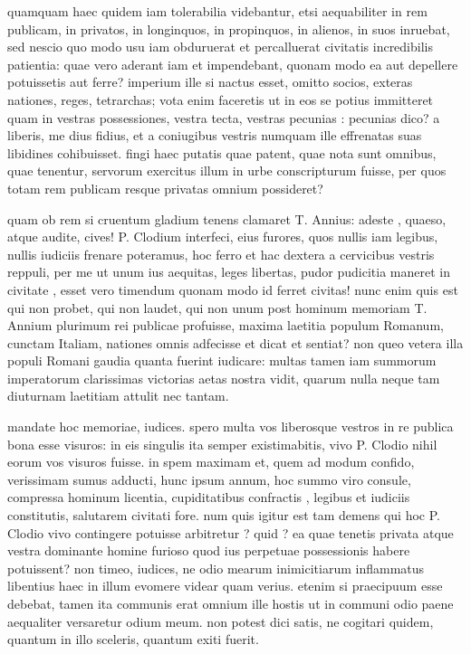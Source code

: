  quamquam haec quidem iam tolerabilia videbantur, etsi aequabiliter in rem publicam, in privatos, in longinquos, in propinquos, in alienos, in suos inruebat, sed nescio quo modo usu iam obduruerat et percalluerat civitatis incredibilis patientia: quae vero aderant iam et impendebant, quonam modo ea aut depellere potuissetis aut ferre? imperium ille si nactus esset, omitto socios, exteras nationes, reges, tetrarchas; vota enim faceretis ut in eos se potius immitteret quam in vestras possessiones, vestra tecta, vestras pecunias : pecunias dico? a liberis, me dius fidius, et a coniugibus vestris numquam ille effrenatas suas libidines cohibuisset. fingi haec putatis quae patent, quae nota sunt omnibus, quae tenentur, servorum exercitus illum in urbe conscripturum fuisse, per quos totam rem publicam resque privatas omnium possideret?

 quam ob rem si cruentum gladium tenens clamaret T. Annius: adeste , quaeso, atque audite, cives! P. Clodium interfeci, eius furores, quos nullis iam legibus, nullis iudiciis frenare poteramus, hoc ferro et hac dextera a cervicibus vestris reppuli, per me ut unum ius aequitas, leges libertas, pudor pudicitia maneret in civitate , esset vero timendum quonam modo id ferret civitas! nunc enim quis est qui non probet, qui non laudet, qui non unum post hominum memoriam T. Annium plurimum rei publicae profuisse, maxima laetitia populum Romanum, cunctam Italiam, nationes omnis adfecisse et dicat et sentiat? non queo vetera illa populi Romani gaudia quanta fuerint iudicare: multas tamen iam summorum imperatorum clarissimas victorias aetas nostra vidit, quarum nulla neque tam diuturnam laetitiam attulit nec tantam.

 mandate hoc memoriae, iudices. spero multa vos liberosque vestros in re publica bona esse visuros: in eis singulis ita semper existimabitis, vivo P. Clodio nihil eorum vos visuros fuisse. in spem maximam et, quem ad modum confido, verissimam sumus adducti, hunc ipsum annum, hoc summo viro consule, compressa hominum licentia, cupiditatibus confractis , legibus et iudiciis constitutis, salutarem civitati fore. num quis igitur est tam demens qui hoc P. Clodio vivo contingere potuisse arbitretur ? quid ? ea quae tenetis privata atque vestra dominante homine furioso quod ius perpetuae possessionis habere potuissent? non timeo, iudices, ne odio mearum inimicitiarum inflammatus libentius haec in illum evomere videar quam verius. etenim si praecipuum esse debebat, tamen ita communis erat omnium ille hostis ut in communi odio paene aequaliter versaretur odium meum. non potest dici satis, ne cogitari quidem, quantum in illo sceleris, quantum exiti fuerit.


